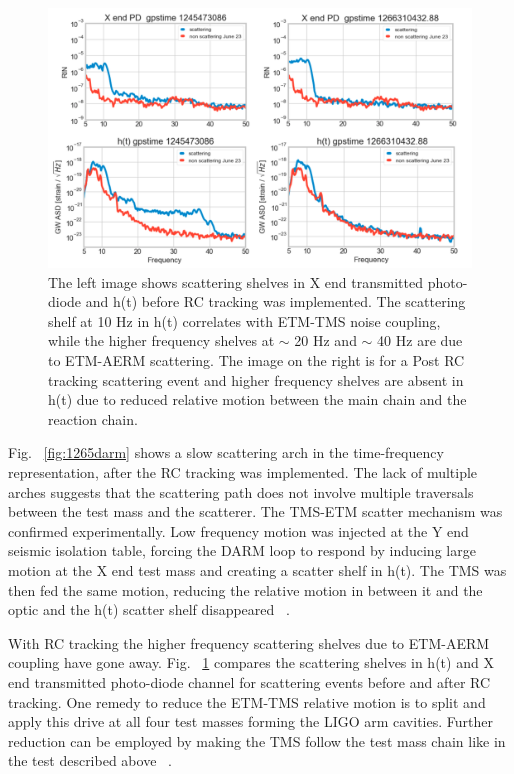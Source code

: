 \documentclass[12pt]{iopart}
\begin{document}
\begin{figure}[h]
    \centering
    \includegraphics[width=\textwidth]{etm-transmon.png}
    \caption{The left image shows scattering shelves in X end transmitted photo-diode and h(t) before RC tracking was implemented. The scattering shelf at 10 Hz in h(t) correlates with ETM-TMS noise coupling, while the higher frequency shelves at $\sim$ 20 Hz and $\sim$ 40 Hz are due to ETM-AERM scattering. The image on the right is for a Post RC tracking scattering event and higher frequency shelves are absent in h(t) due to reduced relative motion between the main chain and the reaction chain.}
    \label{fig:etm-transmon}
\end{figure}

\par
Fig. ~\ref{fig:1265darm} shows a slow scattering arch in the time-frequency representation, after the RC tracking was implemented. The lack of multiple arches suggests that the scattering path does not involve multiple traversals between the test mass and the scatterer. The TMS-ETM scatter mechanism was confirmed experimentally. Low frequency motion was injected at the Y end seismic isolation table, forcing the DARM loop to respond by inducing large motion at the X end test mass and creating a scatter shelf in h(t). The TMS was then fed the same motion, reducing the relative motion in between it and the optic and the h(t) scatter shelf disappeared ~\cite{alogae_tmsx,alogsid_tmsx}.

 With RC tracking the higher frequency scattering shelves due to ETM-AERM coupling have gone away. Fig. ~\ref{fig:etm-transmon} compares the scattering shelves in h(t) and X end transmitted photo-diode channel for scattering events before and after RC tracking. One remedy to reduce the ETM-TMS relative motion is to split and apply this drive at all four test masses forming the LIGO arm cavities. Further reduction can be employed by making the TMS follow the test mass chain like in the test described above ~\cite{alog_anamaria,alogsid_R0}.
\end{document}

